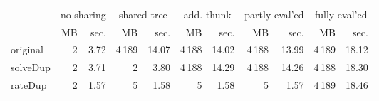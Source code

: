 \makeatletter
\begin{tabular}{lrrrrrrrrrr}
 \\
& \multicolumn{2}{c}{no sharing}& \multicolumn{2}{c}{shared tree}& \multicolumn{2}{c}{add. thunk}& \multicolumn{2}{c}{partly eval'ed}& \multicolumn{2}{c}{fully eval'ed} \\
& MB & sec.& MB & sec.& MB & sec.& MB & sec.& MB & sec. \\ \midrule 
original& {\def\@currentlabel{2}\label{stats:Original:Unshared:mem}2} & {\def\@currentlabel{3.72}\label{stats:Original:Unshared:time}3.72}& {\def\@currentlabel{4\,189}\label{stats:Original:Shared:mem}4\,189} & {\def\@currentlabel{14.07}\label{stats:Original:Shared:time}14.07}& {\def\@currentlabel{4\,188}\label{stats:Original:SharedThunk:mem}4\,188} & {\def\@currentlabel{14.02}\label{stats:Original:SharedThunk:time}14.02}& {\def\@currentlabel{4\,188}\label{stats:Original:SharedEvaled:mem}4\,188} & {\def\@currentlabel{13.99}\label{stats:Original:SharedEvaled:time}13.99}& {\def\@currentlabel{4\,189}\label{stats:Original:SharedFull:mem}4\,189} & {\def\@currentlabel{18.12}\label{stats:Original:SharedFull:time}18.12} \\
\textsf{solveDup}& {\def\@currentlabel{2}\label{stats:SolveDup:Unshared:mem}2} & {\def\@currentlabel{3.71}\label{stats:SolveDup:Unshared:time}3.71}& {\def\@currentlabel{2}\label{stats:SolveDup:Shared:mem}2} & {\def\@currentlabel{3.80}\label{stats:SolveDup:Shared:time}3.80}& {\def\@currentlabel{4\,188}\label{stats:SolveDup:SharedThunk:mem}4\,188} & {\def\@currentlabel{14.29}\label{stats:SolveDup:SharedThunk:time}14.29}& {\def\@currentlabel{4\,188}\label{stats:SolveDup:SharedEvaled:mem}4\,188} & {\def\@currentlabel{14.26}\label{stats:SolveDup:SharedEvaled:time}14.26}& {\def\@currentlabel{4\,188}\label{stats:SolveDup:SharedFull:mem}4\,188} & {\def\@currentlabel{18.30}\label{stats:SolveDup:SharedFull:time}18.30} \\
\textsf{rateDup}& {\def\@currentlabel{2}\label{stats:RateDup:Unshared:mem}2} & {\def\@currentlabel{1.57}\label{stats:RateDup:Unshared:time}1.57}& {\def\@currentlabel{5}\label{stats:RateDup:Shared:mem}5} & {\def\@currentlabel{1.58}\label{stats:RateDup:Shared:time}1.58}& {\def\@currentlabel{5}\label{stats:RateDup:SharedThunk:mem}5} & {\def\@currentlabel{1.58}\label{stats:RateDup:SharedThunk:time}1.58}& {\def\@currentlabel{5}\label{stats:RateDup:SharedEvaled:mem}5} & {\def\@currentlabel{1.57}\label{stats:RateDup:SharedEvaled:time}1.57}& {\def\@currentlabel{4\,189}\label{stats:RateDup:SharedFull:mem}4\,189} & {\def\@currentlabel{18.46}\label{stats:RateDup:SharedFull:time}18.46} \\

\end{tabular}
